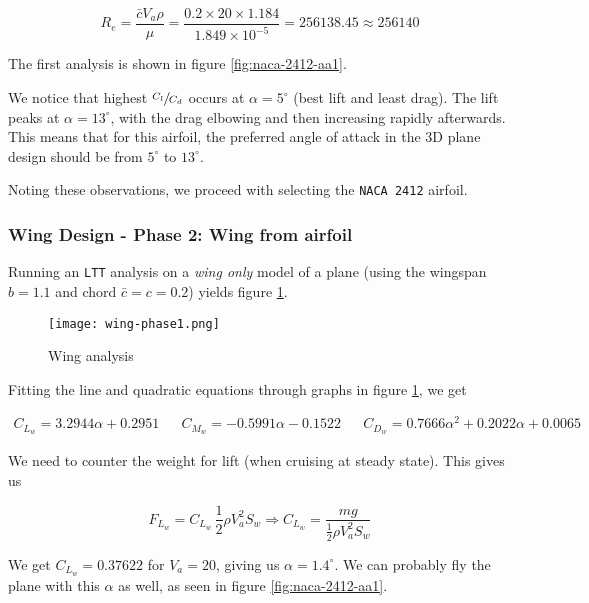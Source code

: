 \begin{equation}
    R_e = \frac{\bar{c} V_a \rho}{\mu} = \frac{0.2 \times 20 \times 1.184}{1.849\times 10^{-5}} = 256138.45 \approx 256140  
\end{equation}

The first analysis is shown in figure \ref{fig:naca-2412-aa1}.

We notice that highest $\sfrac{C_l}{C_d}$ occurs at $\alpha = 5^\circ$ (best lift and least drag). The lift peaks at $\alpha=13^\circ$, with the drag elbowing and then increasing rapidly afterwards. This means that for this airfoil, the preferred angle of attack in the 3D plane design should be from $5^\circ$ to $13^\circ$.

Noting these observations, we proceed with selecting the \texttt{NACA 2412} airfoil.

\subsubsection*{Wing Design - Phase 2: Wing from airfoil}

Running an \texttt{LTT} analysis on a \emph{wing only} model of a plane (using the wingspan $b = 1.1$ and chord $\bar{c} = c = 0.2$) yields figure \ref{fig:wing-phase1}.

\begin{figure}[ht]
    \centering
    \texttt{[image: wing-phase1.png]}
    \caption{Wing analysis}
    \label{fig:wing-phase1}
\end{figure}

Fitting the line and quadratic equations through graphs in figure \ref{fig:wing-phase1}, we get

\begin{align}
    C_{L_w} = 3.2944 \alpha + 0.2951 &&
    C_{M_w} = -0.5991 \alpha - 0.1522 &&
    C_{D_w} = 0.7666 \alpha^2 + 0.2022 \alpha + 0.0065
\end{align}

We need to counter the weight for lift (when cruising at steady state). This gives us

\begin{equation}
    F_{L_w} = C_{L_w} \, \frac{1}{2} \rho V_a^2 S_w
    \Rightarrow C_{L_w} = \frac{mg}{\frac{1}{2} \rho V_a^2 S_w}
\end{equation}

We get $C_{L_w} = 0.37622$ for $V_a = 20$, giving us $\alpha = 1.4^\circ$. We can probably fly the plane with this $\alpha$ as well, as seen in figure \ref{fig:naca-2412-aa1}.


